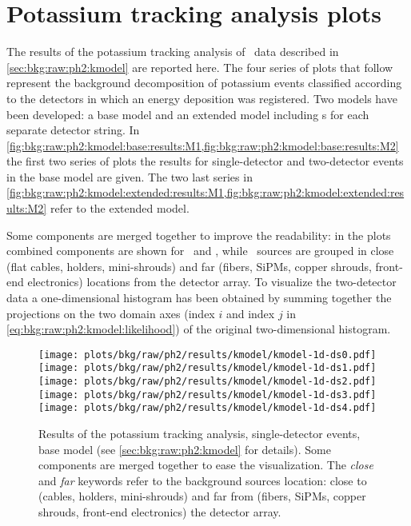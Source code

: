 
\chapter{Potassium tracking analysis plots}%
\label{apdx:kmodelplots}

The results of the potassium tracking analysis of \gerdatwo\ data described in
\cref{sec:bkg:raw:ph2:kmodel} are reported here. The four series of plots that follow
represent the background decomposition of potassium events classified according to the
detectors in which an energy deposition was registered. Two models have been developed: a
base model and an extended model including \pdf{}s for each separate detector string.  In
\cref{fig:bkg:raw:ph2:kmodel:base:results:M1,fig:bkg:raw:ph2:kmodel:base:results:M2} the
first two series of plots the results for single-detector and two-detector events in the
base model are given. The two last series in
\cref{fig:bkg:raw:ph2:kmodel:extended:results:M1,fig:bkg:raw:ph2:kmodel:extended:results:M2}
refer to the extended model.

Some components are merged together to improve the readability: in the  plots
combined components are shown for \kvz\ and \Bih, while \kvn\ sources are grouped in close
(flat cables, holders, mini-shrouds) and far (fibers, SiPMs, copper shrouds, front-end
electronics) locations from the detector array. To visualize the two-detector data a
one-dimensional histogram has been obtained by summing together the projections on the two
domain axes (index $i$ and index $j$ in \cref{eq:bkg:raw:ph2:kmodel:likelihood}) of the
original two-dimensional histogram.

\begin{figure}
  \centering
  \texttt{[image: plots/bkg/raw/ph2/results/kmodel/kmodel-1d-ds0.pdf]}
  \texttt{[image: plots/bkg/raw/ph2/results/kmodel/kmodel-1d-ds1.pdf]}\vspace{10pt}
  \texttt{[image: plots/bkg/raw/ph2/results/kmodel/kmodel-1d-ds2.pdf]}
  \texttt{[image: plots/bkg/raw/ph2/results/kmodel/kmodel-1d-ds3.pdf]}\vspace{10pt}
  \texttt{[image: plots/bkg/raw/ph2/results/kmodel/kmodel-1d-ds4.pdf]}
  \begin{minipage}[b][5.3cm][c]{0.45\textwidth}
    \hspace{15pt}%
    \parbox{0.91\textwidth}{%
      \caption{%
        Results of the potassium tracking analysis, single-detector events, base model (see
        \cref{sec:bkg:raw:ph2:kmodel} for details). Some components are merged together to
        ease the visualization. The \emph{close} and \emph{far} keywords refer to the
        background sources location: close to (cables, holders, mini-shrouds) and far from
        (fibers, SiPMs, copper shrouds, front-end electronics) the detector array.
      }\label{fig:bkg:raw:ph2:kmodel:base:results:M1}
    }
  \end{minipage}
\end{figure}


